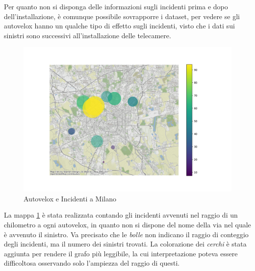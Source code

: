 \documentclass[a4paper,12pt]{report}
\newcommand{\quotestyle}[1]{\textit{#1}}
\begin{document}
Per quanto non si disponga delle informazioni sugli incidenti prima e dopo dell'installazione, 
è comunque possibile sovrapporre i dataset, per vedere se gli autovelox hanno un qualche tipo di 
effetto sugli incidenti, visto che i dati sui sinistri sono successivi all'installazione 
delle telecamere.

\begin{figure}
    \includegraphics[width=\linewidth]{../src/autovelox/autovelox_incidenti.png}
    \caption{Autovelox e Incidenti a Milano}
    \label{fig:autovelox-incidenti}
\end{figure}

La mappa \ref{fig:autovelox-incidenti} è stata realizzata contando gli incidenti avvenuti 
nel raggio di un chilometro a ogni autovelox, in quanto non si dispone del nome della 
via nel quale è avvenuto il sinistro. 
Va precisato che le \quotestyle{bolle} non indicano il raggio di conteggio degli incidenti, ma 
il numero dei sinistri trovati. La colorazione dei \quotestyle{cerchi} è stata aggiunta per 
rendere il grafo più leggibile, la cui interpretazione poteva essere difficoltosa 
osservando solo l'ampiezza del raggio di questi.
\end{document}
